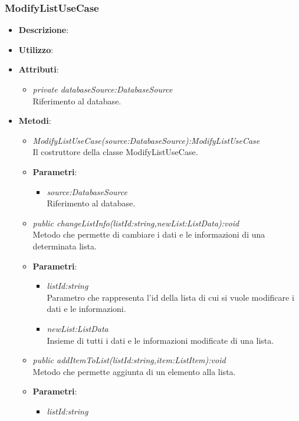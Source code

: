 \subsubsection{ModifyListUseCase}
\begin{itemize}
\item \textbf{Descrizione}: 
\item \textbf{Utilizzo}:
\item \textbf{Attributi}: 
	\begin{itemize}
	\item \textit{private databaseSource:DatabaseSource}\\
			Riferimento al database.
	\end{itemize}
\item \textbf{Metodi}:
	\begin{itemize}
	\item \textit{ModifyListUseCase(source:DatabaseSource):ModifyListUseCase}\\
	Il costruttore della classe ModifyListUseCase.
			\item{\textbf{Parametri}: \begin{itemize}
			\item \textit{source:DatabaseSource}\\
						Riferimento al database.
			\end{itemize}}
	\item \textit{public changeListInfo(listId:string,newList:ListData):void}\\
	Metodo che permette di cambiare i dati e le informazioni di una determinata lista.
			\item{\textbf{Parametri}: \begin{itemize}
			\item \textit{listId:string}\\
			Parametro che rappresenta l'id della lista di cui si vuole modificare i dati e le informazioni.
			\item \textit{newList:ListData}\\
			Insieme di tutti i dati e le informazioni modificate di una lista.
			\end{itemize}}
	\item \textit{public addItemToList(listId:string,item:ListItem):void}\\
	Metodo che permette aggiunta di un elemento alla lista.
			\item{\textbf{Parametri}: \begin{itemize}
			\item \textit{listId:string}\\

\end{itemize}}
\end{itemize}
\end{itemize}
